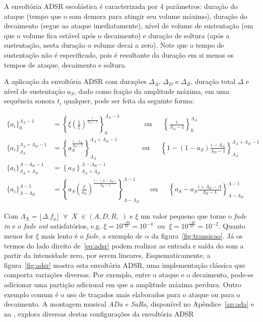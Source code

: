 A envoltória ADSR escolástica é caracterizada por 4 parâmetros: duração do ataque (tempo que o som demora para atingir seu volume máximo), duração do decaimento (segue ao ataque imediatamente), nível de volume de sustentação (em que o volume fica estável após o decaimento) e duração de soltura (após a sustentação, nesta duração o volume decai a zero).
Note que o tempo de sustentação não é especificado, pois é resultante da duração em si menos os tempos de ataque, decaimento e soltura.

A aplicação da envoltória ADSR com durações $\Delta_A$, $\Delta_D$ e $\Delta_R$, duração total $\Delta$ e nível de sustentação $a_S$, dado
como fração da amplitude máxima, em uma sequência sonora $t_i$ qualquer, pode ser feita da seguinte forma:

\begin{equation}\label{eq:adsr}
\begin{split}
\{a_i\}_0^{\Lambda_A-1} & = \left\{\xi\left(\frac{1}{\xi}\right)^{\frac{i}{\Lambda_A-1}}\right\}_0^{\Lambda_A-1} \;\;\quad\quad\quad \text{ou} \;\;\quad \left\{\frac{i}{\Lambda_A-1}\right\}_0^{\Lambda_A}\\
\{a_i\}_{\Lambda_A}^{\Lambda_A+\Lambda_D-1} & =\left\{a_S^{\frac{i-\Lambda_A}{\Lambda_D-1}}  \right\}_{\Lambda_A}^{\Lambda_A+\Lambda_D-1} \;\;\quad \quad\quad \text{ou} \quad\;\; \left\{1-(1-a_S)\frac{i-\Lambda_A}{\Lambda_D-1}\right\}_{\Lambda_A}^{\Lambda_A+\Lambda_D-1}\\
\{ a_i \}_{\Lambda_A+\Lambda_D}^{\Lambda-\Lambda_R-1} & =\left\{ a_S \right\}_{\Lambda_A+\Lambda_D}^{\Lambda-\Lambda_R-1} \\
\{ a_i \}_{\Lambda-\Lambda_R}^{\Lambda-1} & =\left\{ a_S\left(\frac{\xi}{a_S} \right)^{\frac{i-(\Lambda-\Lambda_R)}{\Lambda_R-1}} \right\}_{\Lambda-\Lambda_R}^{\Lambda-1} \quad\;\; \text{ou} \quad\;\; \left\{ a_S - a_S\frac{i+\Lambda_R-\Lambda}{\Lambda_R-1}\right\}_{\Lambda-\Lambda_R}^{\Lambda-1} 
\end{split}
\end{equation}

Com $\Lambda_X=\lfloor \Delta . f_a \rfloor\;\;\forall\;\; X \; \in (A,D,R,\;)$ e $\xi$ um valor pequeno que torne o \emph{fade in} e o \emph{fade out} satisfatórios, e.g. $\xi=10^{\frac{-80}{20}}=10^{-4}\;$ ou $\;\xi=10^{\frac{-40}{20}}=10^{-2}$. Quanto menor for $\xi$ mais lento é o \emph{fade}, a exemplo de $\alpha$ da figura~\ref{fig:transicao}. Já os termos do lado direito de~\ref{eq:adsr} podem realizar as entrada e saída do som a partir da intensidade zero, por serem lineares. 
Esquematicamente, a figura~\ref{fig:adsr} mostra esta envoltória ADSR, 
uma implementação clássica que comporta variações diversas. Por exemplo,
entre o ataque e o decaimento, pode-se adicionar uma partição adicional em que a amplitude
máxima perdura. Outro exemplo comum é o uso de traçados mais elaborados para o
ataque ou para o decaimento. A montagem musical \emph{ADa e SaRa}, disponível no Apêndice~\ref{ap:ada}
e na \massa, explora diversas destas configurações da envoltória ADSR


